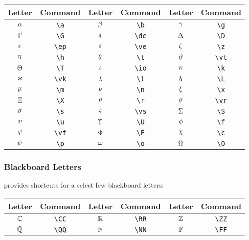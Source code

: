 \begin{table}[H]
    \centering
    \begin{tabular}{|cc|cc|cc|}
        \hline
        \textbf{Letter} & \textbf{Command} & \textbf{Letter} & \textbf{Command} & \textbf{Letter} & \textbf{Command} \\ \hline \hline
        $\a$ & \verb|\a| & $\b$ & \verb|\b| & $\g$ & \verb|\g| \\ \hline
        $\G$ & \verb|\G| & $\de$ & \verb|\de| & $\D$ & \verb|\D| \\ \hline
        $\ep$ & \verb|\ep| & $\ve$ & \verb|\ve| & $\z$ & \verb|\z| \\ \hline
        $\h$ & \verb|\h| & $\t$ & \verb|\t| & $\vt$ & \verb|\vt| \\ \hline
        $\T$ & \verb|\T| & $\io$ & \verb|\io| & $\k$ & \verb|\k| \\ \hline
        $\vk$ & \verb|\vk| & $\l$ & \verb|\l| & $\L$ & \verb|\L| \\ \hline
        $\m$ & \verb|\m| & $\n$ & \verb|\n| & $\x$ & \verb|\x| \\ \hline
        $\X$ & \verb|\X| & $\r$ & \verb|\r| & $\vr$ & \verb|\vr| \\ \hline
        $\s$ & \verb|\s| & $\vs$ & \verb|\vs| & $\S$ & \verb|\S| \\ \hline
        $\u$ & \verb|\u| & $\U$ & \verb|\U| & $\f$ & \verb|\f| \\ \hline
        $\vf$ & \verb|\vf| & $\F$ & \verb|\F| & $\c$ & \verb|\c| \\ \hline
        $\p$ & \verb|\p| & $\o$ & \verb|\o| & $\O$ & \verb|\O| \\ \hline
    \end{tabular}
\end{table}

\subsubsection{Blackboard Letters}

\asdiasty{} provides shortcuts for a select few blackboard letters:

\begin{table}[H]
    \centering
    \begin{tabular}{|cc|cc|cc|}
        \hline
        \textbf{Letter} & \textbf{Command} & \textbf{Letter} & \textbf{Command} & \textbf{Letter} & \textbf{Command} \\ \hline \hline
        $\CC$ & \verb|\CC| & $\RR$ & \verb|\RR| & $\ZZ$ & \verb|\ZZ| \\ \hline
        $\QQ$ & \verb|\QQ| & $\NN$ & \verb|\NN| & $\FF$ & \verb|\FF| \\ \hline
    \end{tabular}
\end{table}

